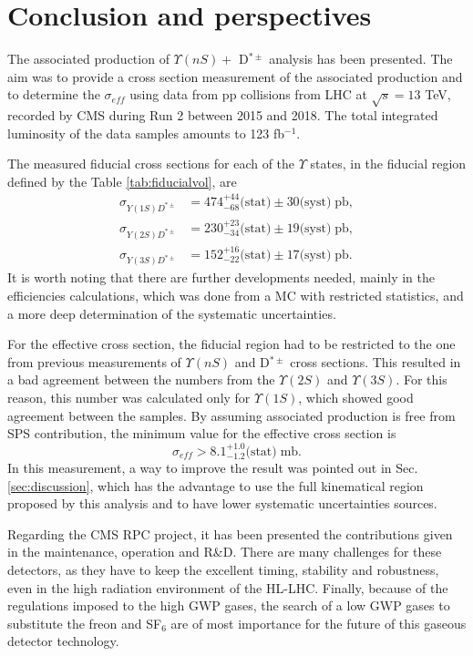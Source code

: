 \chapter{Conclusion and perspectives}\label{chap:conclusion}

The associated production of $\Upsilon(nS) + $ D$^{*\pm}$ analysis has been presented. The aim was to provide a cross section measurement of the associated production and to determine the $\sigma_{eff}$ using data from pp collisions from LHC at $\sqrt{s} = 13$ TeV, recorded by CMS during Run 2 between 2015 and 2018. The total integrated luminosity of the data samples amounts to 123 fb$^{-1}$.

The measured fiducial cross sections for each of the $\Upsilon$ states, in the fiducial region defined by the Table \ref{tab:fiducialvol}, are
\begin{equation}
\begin{split}
    \sigma_{Y(1S)D^{*\pm}} &= 474^{+44}_{-68} \text{(stat)} \pm 30 \text{(syst)} \; \text{pb},\\
    \sigma_{Y(2S)D^{*\pm}} &= 230^{+23}_{-34} \text{(stat)} \pm 19 \text{(syst)} \; \text{pb},\\
    \sigma_{Y(3S)D^{*\pm}} &= 152^{+16}_{-22} \text{(stat)} \pm 17 \text{(syst)} \; \text{pb}.
\end{split} 
\end{equation}
It is worth noting that there are further developments needed, mainly in the efficiencies calculations, which was done from a MC with restricted statistics, and a more deep determination of the systematic uncertainties.

For the effective cross section, the fiducial region had to be restricted to the one from previous measurements of $\Upsilon(nS)$ and D$^{*\pm}$ cross sections. This resulted in a bad agreement between the numbers from the $\Upsilon(2S)$ and $\Upsilon(3S)$. For this reason, this number was calculated only for $\Upsilon(1S)$, which showed good agreement between the samples. By assuming associated production is free from SPS contribution, the minimum value for the effective cross section is
\begin{equation}
\sigma_{eff} > 8.1^{+1.0}_{-1.2}\text{(stat)} \; \text{mb}.
\end{equation}
In this measurement, a way to improve the result was pointed out in Sec. \ref{sec:discussion}, which has the advantage to use the full kinematical region proposed by this analysis and to have lower systematic uncertainties sources. 

Regarding the CMS RPC project, it has been presented the contributions given in the maintenance, operation and R\&D. There are many challenges for these detectors, as they have to keep the excellent timing, stability and robustness, even in the high radiation environment of the HL-LHC. Finally, because of the regulations imposed to the high GWP gases, the search of a low GWP gases to substitute the freon and SF$_6$ are of most importance for the future of this gaseous detector technology.